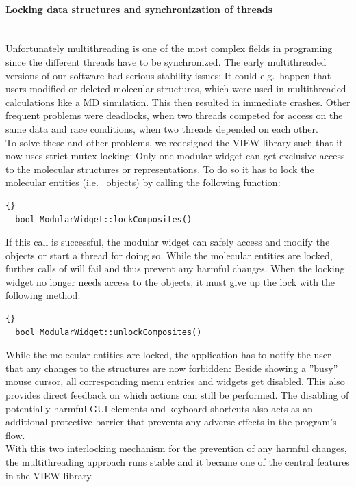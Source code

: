 \paragraph{Locking data structures and synchronization of threads}
\hspace*{\fill}\\
Unfortunately multithreading is one of the most complex fields in programing since the different 
threads have to be synchronized.
The early multithreaded versions of our software had serious stability issues: It could e.g.\ happen
that users modified or deleted molecular structures, which were used in multithreaded calculations 
like a MD simulation. This then resulted in immediate crashes. Other frequent problems were deadlocks,
when two threads competed for access on the same data and race conditions, when two threads depended on each other.\\
To solve these and other problems, we redesigned the VIEW library such that it now uses strict mutex locking:
Only one modular widget can get exclusive access to the molecular structures or representations.
To do so it has to lock the molecular entities (i.e.\  objects) by calling the following function:
\begin{lstlisting}{}
  bool ModularWidget::lockComposites()
\end{lstlisting}
If this call is successful, the modular widget can safely access and modify the  objects or
start a thread for doing so. While the molecular entities are locked, further calls of  will
fail and thus prevent any harmful changes. When the locking widget no longer needs access to the  objects,
it must give up the lock with the following method:
\begin{lstlisting}{}
  bool ModularWidget::unlockComposites()
\end{lstlisting}

\vspace{0.5cm}

While the molecular entities are locked, the application has to notify the user that any changes to the structures are now forbidden:
Beside showing a ''busy'' mouse cursor, all corresponding menu entries and widgets get disabled. This also provides direct
feedback on which actions can still be performed. The disabling of potentially harmful GUI elements and keyboard shortcuts also
acts as an additional protective barrier that prevents any adverse effects in the program's flow.
\\
With this two interlocking mechanism for the prevention of any harmful changes, the multithreading approach runs stable
and it became one of the central features in the VIEW library.

